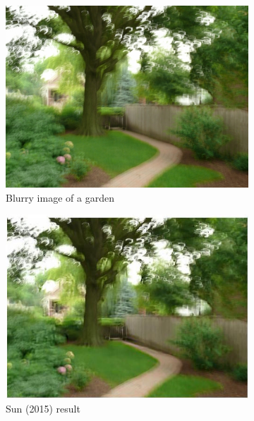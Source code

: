 \documentclass[10pt,twocolumn,letterpaper]{article}
\begin{document}
\begin{figure}
\begin{center}
\graphicspath{ {deblursun/} }
\begin{subfigure}{0.45\textwidth}

\includegraphics[width=0.9\linewidth]{garden_s01_it0000_blurry} 
\caption{Blurry image of a garden}
\label{fig:subim85}
\end{subfigure}
\begin{subfigure}{0.45\textwidth}
\includegraphics[width=0.9\linewidth]{garden_deblurred}
\caption{Sun \etal (2015) result}
\label{fig:subim86}
\end{subfigure}
\begin{subfigure}{0.45\textwidth}

\end{subfigure}
\end{center}
\end{figure}
\end{document}
